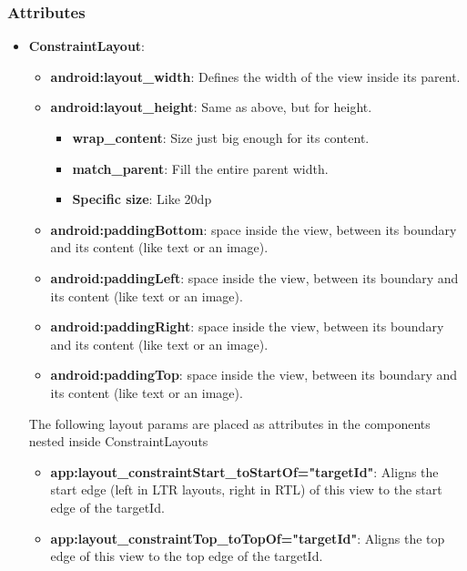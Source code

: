 \documentclass{report}
\begin{document}
\begin{itemize}
    \end{itemize}

    \pagebreak 
    \subsubsection{Attributes}
    \begin{itemize}
        \item \textbf{ConstraintLayout}:
            \begin{itemize}
                \item \textbf{android:layout\_width}: Defines the width of the view inside its parent.
                \item \textbf{android:layout\_height}: Same as above, but for height.
                    \begin{itemize}
                        \item \textbf{wrap\_content}: Size just big enough for its content.
                        \item \textbf{match\_parent}: Fill the entire parent width.
                        \item \textbf{Specific size}: Like 20dp
                    \end{itemize}
                \item \textbf{android:paddingBottom}: space inside the view, between its boundary and its content (like text or an image).
                \item \textbf{android:paddingLeft}: space inside the view, between its boundary and its content (like text or an image).
                \item \textbf{android:paddingRight}: space inside the view, between its boundary and its content (like text or an image).
                \item \textbf{android:paddingTop}: space inside the view, between its boundary and its content (like text or an image).
            \end{itemize}
            The following layout params are placed as attributes in the components nested inside ConstraintLayouts
            \begin{itemize}
                \item \textbf{app:layout\_constraintStart\_toStartOf="targetId"}: Aligns the start edge (left in LTR layouts, right in RTL) of this view to the start edge of the targetId.
                \item \textbf{app:layout\_constraintTop\_toTopOf="targetId"}: Aligns the top edge of this view to the top edge of the targetId.

\end{itemize}
\end{itemize}
\end{document}
